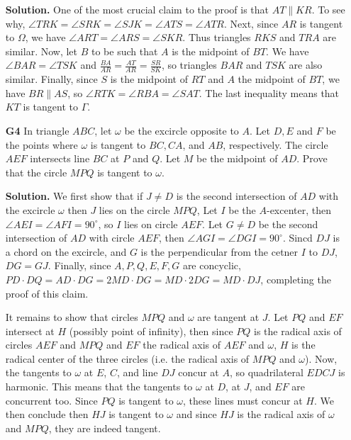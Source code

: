 \documentclass[11pt,a4paper]{article}
\begin{document}
\begin{enumerate}
	\textbf{Solution.} One of the most crucial claim to the proof is that $AT\parallel KR$. To see why, $\angle TRK = \angle SRK = \angle SJK = \angle ATS=\angle ATR$. Next, since $AR$ is tangent to $\Omega$, we have $\angle ART=\angle ARS=\angle SKR$. Thus triangles $RKS$ and $TRA$ are similar. Now, let $B$ to be such that $A$ is the midpoint of $BT$. We have $\angle BAR=\angle TSK$ and $\frac{BA}{AR}=\frac{AT}{AR}=\frac{SR}{SK}$, so triangles $BAR$ and $TSK$ are also similar. Finally, since $S$ is the midpoint of $RT$ and $A$ the midpoint of $BT$, we have $BR\parallel AS$, so $\angle RTK=\angle RBA=\angle SAT$. The last inequality means that $KT$ is tangent to $\Gamma$. 
	
	\item[\textbf{G4}] In triangle $ABC$, let $\omega$ be the excircle opposite to $A$. Let $D, E$ and $F$ be the points where $\omega$ is tangent to $BC, CA$, and $AB$, respectively. The circle $AEF$ intersects line $BC$ at $P$ and $Q$. Let $M$ be the midpoint of $AD$. Prove that the circle $MPQ$ is tangent to $\omega$.
	
	\textbf{Solution.} We first show that if $J\neq D$ is the second intersection of $AD$ with the excircle $\omega$ then $J$ lies on the circle $MPQ$, Let $I$ be the $A$-excenter, then $\angle AEI=\angle AFI=90^{\circ}$, so $I$ lies on circle $AEF$. Let $G\neq D$ be the second intersection of $AD$ with circle $AEF$, then $\angle AGI=\angle DGI=90^{\circ}$. Sincd $DJ$ is a chord on the excircle, and $G$ is the perpendicular from the cetner $I$ to $DJ$, $DG=GJ$. Finally, since $A, P, Q, E, F, G$ are concyclic, $PD\cdot DQ=AD\cdot DG=2MD\cdot DG=MD\cdot 2DG=MD\cdot DJ$, completing the proof of this claim. 
	
	It remains to show that circles $MPQ$ and $\omega$ are tangent at $J$. Let $PQ$ and $EF$ intersect at $H$ (possibly point of infinity), then since $PQ$ is the radical axis of circles $AEF$ and $MPQ$ and $EF$ the radical axis of $AEF$ and $\omega$, $H$ is the radical center of the three circles (i.e. the radical axis of $MPQ$ and $\omega$). Now, the tangents to $\omega$ at $E$, $C$, and line $DJ$ concur at $A$, so quadrilateral $EDCJ$ is harmonic. This means that the tangents to $\omega$ at $D$, at $J$, and $EF$ are concurrent too. Since $PQ$ is tangent to $\omega$, these lines must concur at $H$. We then conclude then $HJ$ is tangent to $\omega$ and since $HJ$ is the radical axis of $\omega$ and $MPQ$, they are indeed tangent. 
	\end{enumerate}
\end{document}
